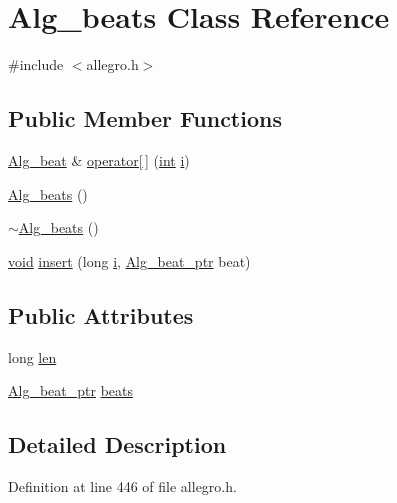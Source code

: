 \hypertarget{class_alg__beats}{}\section{Alg\+\_\+beats Class Reference}
\label{class_alg__beats}


{\ttfamily \#include $<$allegro.\+h$>$}

\subsection*{Public Member Functions}
\begin{DoxyCompactItemize}
\item 
\hyperlink{class_alg__beat}{Alg\+\_\+beat} \& \hyperlink{class_alg__beats_a1baaf9079f025a09970f445965774ab6}{operator\mbox{[}$\,$\mbox{]}} (\hyperlink{xmltok_8h_a5a0d4a5641ce434f1d23533f2b2e6653}{int} \hyperlink{checksum_8c_ab80e330a3bc9e38c1297fe17381e92b4}{i})
\item 
\hyperlink{class_alg__beats_a2507e7638ff614b17598bf97f23c9699}{Alg\+\_\+beats} ()
\item 
\hyperlink{class_alg__beats_a3415ed074737c0827c5da0974ac4401c}{$\sim$\+Alg\+\_\+beats} ()
\item 
\hyperlink{sound_8c_ae35f5844602719cf66324f4de2a658b3}{void} \hyperlink{class_alg__beats_a41ae7a8d40c1445a4d29d5446622aa34}{insert} (long \hyperlink{checksum_8c_ab80e330a3bc9e38c1297fe17381e92b4}{i}, \hyperlink{allegro_8h_ac1597c041808a03118d98c3d43eac63f}{Alg\+\_\+beat\+\_\+ptr} beat)
\end{DoxyCompactItemize}
\subsection*{Public Attributes}
\begin{DoxyCompactItemize}
\item 
long \hyperlink{class_alg__beats_a46587aaf7ffd5d4ca96aeae8e468ce36}{len}
\item 
\hyperlink{allegro_8h_ac1597c041808a03118d98c3d43eac63f}{Alg\+\_\+beat\+\_\+ptr} \hyperlink{class_alg__beats_ada9ebe39404e08838ae7c09b385a7aac}{beats}
\end{DoxyCompactItemize}


\subsection{Detailed Description}


Definition at line 446 of file allegro.\+h.



